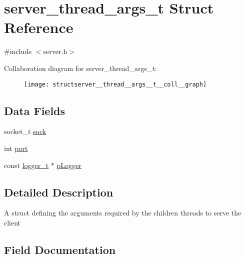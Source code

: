 \hypertarget{structserver__thread__args__t}{}\section{server\+\_\+thread\+\_\+args\+\_\+t Struct Reference}
\label{structserver__thread__args__t}


{\ttfamily \#include $<$server.\+h$>$}



Collaboration diagram for server\+\_\+thread\+\_\+args\+\_\+t\+:\nopagebreak
\begin{figure}[H]
\begin{center}
\leavevmode
\texttt{[image: structserver\_\_thread\_\_args\_\_t\_\_coll\_\_graph]}
\end{center}
\end{figure}
\subsection*{Data Fields}
\begin{DoxyCompactItemize}
\item 
socket\+\_\+t \hyperlink{structserver__thread__args__t_afcaca013fc84d1969ccb28c907ccff77}{sock}
\item 
int \hyperlink{structserver__thread__args__t_a0bf51eeb92c580aad89b8492cdb7c9bd}{port}
\item 
const \hyperlink{structlogger__t}{logger\+\_\+t} $\ast$ \hyperlink{structserver__thread__args__t_ad7c9b5025d97f79a8fbf390b9e340501}{p\+Logger}
\end{DoxyCompactItemize}


\subsection{Detailed Description}
A struct defining the arguments required by the children threads to serve the client 

\subsection{Field Documentation}
\mbox{\label{structserver__thread__args__t_ad7c9b5025d97f79a8fbf390b9e340501}} 

